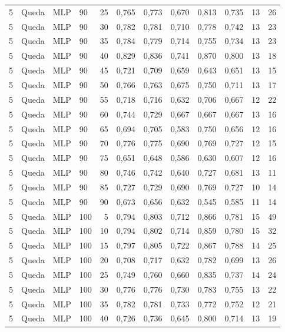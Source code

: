 \begin{longtable}{ccclrrrrrrrr}
5 & Queda & MLP & 90 & 25 & 0,765 & 0,773 & 0,670 & 0,813 & 0,735 & 13 & 26 \\
5 & Queda & MLP & 90 & 30 & 0,782 & 0,781 & 0,710 & 0,778 & 0,742 & 13 & 23 \\
5 & Queda & MLP & 90 & 35 & 0,784 & 0,779 & 0,714 & 0,755 & 0,734 & 13 & 23 \\
5 & Queda & MLP & 90 & 40 & 0,829 & 0,836 & 0,741 & 0,870 & 0,800 & 13 & 18 \\
5 & Queda & MLP & 90 & 45 & 0,721 & 0,709 & 0,659 & 0,643 & 0,651 & 13 & 15 \\
5 & Queda & MLP & 90 & 50 & 0,766 & 0,763 & 0,675 & 0,750 & 0,711 & 13 & 17 \\
5 & Queda & MLP & 90 & 55 & 0,718 & 0,716 & 0,632 & 0,706 & 0,667 & 12 & 22 \\
5 & Queda & MLP & 90 & 60 & 0,744 & 0,729 & 0,667 & 0,667 & 0,667 & 13 & 16 \\
5 & Queda & MLP & 90 & 65 & 0,694 & 0,705 & 0,583 & 0,750 & 0,656 & 12 & 16 \\
5 & Queda & MLP & 90 & 70 & 0,776 & 0,775 & 0,690 & 0,769 & 0,727 & 12 & 15 \\
5 & Queda & MLP & 90 & 75 & 0,651 & 0,648 & 0,586 & 0,630 & 0,607 & 12 & 16 \\
5 & Queda & MLP & 90 & 80 & 0,746 & 0,742 & 0,640 & 0,727 & 0,681 & 13 & 11 \\
5 & Queda & MLP & 90 & 85 & 0,727 & 0,729 & 0,690 & 0,769 & 0,727 & 10 & 14 \\
5 & Queda & MLP & 90 & 90 & 0,673 & 0,656 & 0,632 & 0,545 & 0,585 & 11 & 14 \\
5 & Queda & MLP & 100 & 5 & 0,794 & 0,803 & 0,712 & 0,866 & 0,781 & 15 & 49 \\
5 & Queda & MLP & 100 & 10 & 0,794 & 0,802 & 0,714 & 0,859 & 0,780 & 15 & 32 \\
5 & Queda & MLP & 100 & 15 & 0,797 & 0,805 & 0,722 & 0,867 & 0,788 & 14 & 25 \\
5 & Queda & MLP & 100 & 20 & 0,708 & 0,717 & 0,632 & 0,782 & 0,699 & 13 & 26 \\
5 & Queda & MLP & 100 & 25 & 0,749 & 0,760 & 0,660 & 0,835 & 0,737 & 14 & 24 \\
5 & Queda & MLP & 100 & 30 & 0,776 & 0,776 & 0,730 & 0,783 & 0,755 & 13 & 22 \\
5 & Queda & MLP & 100 & 35 & 0,782 & 0,781 & 0,733 & 0,772 & 0,752 & 12 & 21 \\
5 & Queda & MLP & 100 & 40 & 0,726 & 0,736 & 0,645 & 0,800 & 0,714 & 13 & 19 \\

\end{longtable}
